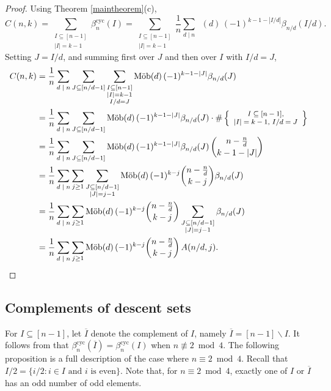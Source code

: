 \documentclass[12pt]{article}
\newcommand{\betacyc}{\beta^{\text{cyc}}}
\DeclareMathOperator{\mob}{M\ddot{o}b}
\theoremstyle{definition}
\begin{document}
\begin{proof} Using Theorem \ref{maintheorem}(c),
$$ C(n,k) = \sum_{\substack{I \subseteq [n-1]\\|I| = k-1}} \betacyc_n(I) = \sum_{\substack{I \subseteq [n-1]\\|I| = k-1}}\frac{1}{n} \sum_{\text{$d\mid n$}} \mob(d)\,(-1)^{k-1-|I/d|} \beta_{n/d}(I/d).$$
Setting $J=I/d$, and summing first over $J$ and then over $I$ with $I/d = J$,
\begin{align*}
C(n,k) &= \frac{1}{n}\sum_{\text{$d\mid n$}} \sum_{J \subseteq [n/d-1]} \sum_{\substack{I \subseteq [n-1]\\|I| = k-1\\ I/d = J}} \mob(d)\,(-1)^{k-1-|J|} \beta_{n/d}(J) \\
&= \frac{1}{n}\sum_{\text{$d\mid n$}} \sum_{J \subseteq [n/d-1]} \mob(d)\,(-1)^{k-1-|J|} \beta_{n/d}(J) \cdot \#\left\{\footnotesize\begin{array}{c}I \subseteq [n-1],\\|I| = k-1,\, I/d = J\end{array}\right\} \\
&= \frac{1}{n}\sum_{\text{$d\mid n$}} \sum_{J \subseteq [n/d-1]} \mob(d)\,(-1)^{k-1-|J|} \beta_{n/d}(J) \,\binom{n-\frac{n}{d}}{k-1-|J|} \\
&= \frac{1}{n}\sum_{\text{$d\mid n$}} \sum_{j\ge1} \sum_{\substack{J \subseteq [n/d-1]\\|J| = j-1}} \mob(d)\,(-1)^{k-j} \binom{n-\frac{n}{d}}{k-j} \beta_{n/d}(J) \\
&= \frac{1}{n}\sum_{\text{$d\mid n$}} \sum_{j\ge1} \mob(d)\,(-1)^{k-j} \binom{n-\frac{n}{d}}{k-j} \sum_{\substack{J \subseteq [n/d-1]\\|J| = j-1}} \beta_{n/d}(J) \\
&= \frac{1}{n}\sum_{\text{$d\mid n$}} \sum_{j\ge1} \mob(d)\,(-1)^{k-j} \binom{n-\frac{n}{d}}{k-j}\,A(n/d,j). \qedhere
\end{align*}\end{proof}

\subsection{Complements of descent sets}

For $I \subseteq [n-1]$, let $\overline{I}$ denote the complement of $I$, namely $\overline{I} = [n-1] \smallsetminus I$. It follows from \cite[Thm.\ 4.1]{GR} that $\betacyc_n(\overline{I}) = \betacyc_n(I)$ when $n \not\equiv 2\bmod 4$. The following proposition is a full description of the case where $n \equiv 2\bmod 4$. Recall that $I/2 = \{i/2 \colon \text{$i \in I$ and $i$ is even}\}$. Note that, for $n \equiv 2\bmod 4$, exactly one of $I$ or $\overline{I}$ has an odd number of odd elements.
\end{document}
